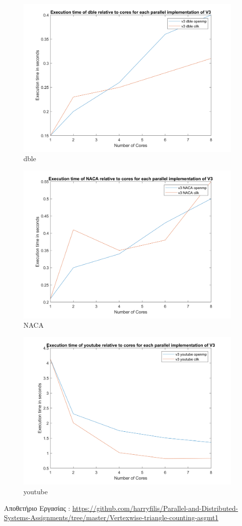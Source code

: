 \documentclass[10pt]{report}
\begin{document}
\begin{figure}[h]
\centering
\includegraphics[scale=0.5]{dble_v3.png}
\caption{dble}
\end{figure}
\begin{figure}[h]
\centering
\includegraphics[scale=0.1]{NACA_v3.png}
\caption{NACA}
\end{figure}
\begin{figure}[h]
\centering
\includegraphics[scale=0.5]{youtube_v3.png}
\caption{youtube}
\end{figure}
\newline
Αποθετήριο Εργασίας : 
\newline
\href{https://github.com/harryfilis/Parallel_and_Distributed_Systems_Assignments/tree/master/Vertexwise_triangle_counting-asgmt1}{https://github.com/harryfilis/Parallel-and-Distributed-Systems-Assignments/tree/master/Vertexwise-triangle-counting-asgmt1}
\end{document}
